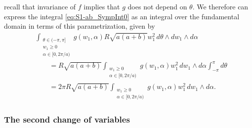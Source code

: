 \documentclass[twoside]{amsart}
\theoremstyle{definition}
\theoremstyle{remark}
\numberwithin{equation}{section}
\begin{document}
recall that invariance of $f$ implies that $g$ does not depend on $\theta$.
We therefore can express the integral \eqref{eq:S1-ab_SympInt0} as an integral over the fundamental domain in terms of this parametrization, given by
\begin{align}
    \nonumber
    &\int_{\substack{\theta\in(-\pi,\pi] \\ w_1 \geq 0 \\ \alpha\in[0,2\pi/a) }} g(w_1, \alpha)
        R \sqrt{a(a + b)} w_1^2
        \, d\theta \wedge dw_1 \wedge d\alpha
    \\
    \nonumber
    &\qquad=
    R \sqrt{a(a + b)}  \int_{\substack{w_1 \geq 0 \\ \alpha\in[0,2\pi/a)}} g(w_1, \alpha)
        w_1^2
        \, dw_1 \wedge  d\alpha \int_{-\pi}^\pi d\theta
    \\
    \label{eq:S1-ab_SympInt1}
    &\qquad=
    2\pi R \sqrt{a(a + b)}  \int_{\substack{w_1 \geq 0 \\ \alpha\in[0,2\pi/a)}} g(w_1, \alpha)
        w_1^2 \, dw_1 \wedge  d\alpha .
\end{align}


\subsubsection{The second change of variables}
\label{subsubsec:S1-ab_SympCOV2}
\end{document}
